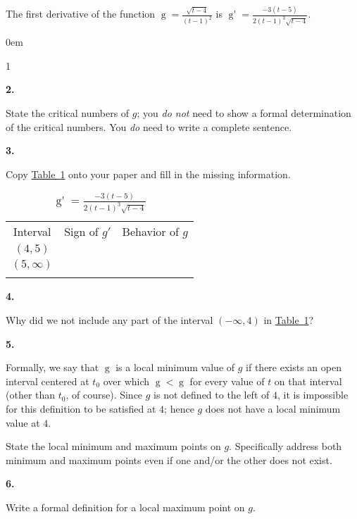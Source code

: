 \documentclass[12pt,]{book}
\newcommand{\lt}{<}
\theoremstyle{plain}
\theoremstyle{definition}
\numberwithin{equation}{section}
\newcommand{\hrulethin}  {\noalign{\hrule height 0.04em}}
\newcommand{\hrulemedium}{\noalign{\hrule height 0.07em}}
\newcommand{\hrulethick} {\noalign{\hrule height 0.11em}}
\newenvironment{exercisegroup}%
{\medskip\noindent}%
{\par\bigskip}%
\newlength{\exercisegroupindent}%
\newlength{\exercisegroupitemwidth}%
\newenvironment{exercisegrouplist}%
{\vspace{-\partopsep}%
\begin{adjustwidth}{\exercisegroupindent}{0em}}%
{\end{adjustwidth}%
\vspace{-\partopsep}%
\vspace{\baselineskip}}%
\newenvironment{exercisegroupbycol}[1]%
{\begin{exercisegrouplist}%
\vspace{-\multicolsep}%
\begin{multicols}{#1}%
\setlength{\parindent}{0em}%
\setlength{\exercisegroupitemwidth}{\linewidth}}%
{\end{multicols}%
\vspace{-\multicolsep}%
\end{exercisegrouplist}}%
\newenvironment{exercisegroupitem}[1]%
{\begin{minipage}[t]{\exercisegroupitemwidth}
\vspace{0pt}%
{\bfseries#1}%
\rule{0pt}{\baselineskip}}{\strut%
\end{minipage}%
\hspace{\columnsep}}%
\providecommand\phantomsection{}
\newcommand{\fe}[2]{\mathop{{#1}{\left(#2\right)}}}
\newcommand{\ointerval}[2]{\left(#1,#2\right)}
\newcommand{\fd}[1]{#1'}
\begin{document}
\begin{exercisegroup}%
The first derivative of the function \(\fe{g}{t}=\frac{\sqrt{t-4}}{(t-1)^2}\) is \(\fe{\fd{g}}{t}=\frac{-3(t-5)}{2(t-1)^3\sqrt{t-4}}\).%
\par
\begin{exercisegroupbycol}{1}%
\begin{exercisegroupitem}{2. }\phantomsection\hypertarget{exercise-22}{\null}
State the critical numbers of \(g\); you \emph{do not} need to show a formal determination of the critical numbers.  You \emph{do} need to write a complete sentence.%
\end{exercisegroupitem}%
\par%
\begin{exercisegroupitem}{3. }\phantomsection\hypertarget{exercise-23}{\null}
Copy \hyperref[table-semi-rational-sign-table]{Table~\ref*{table-semi-rational-sign-table}} onto your paper and fill in the missing information.%
\begin{table}
\centering
\caption{\(\fe{\fd{g}}{t}=\frac{-3(t-5)}{2(t-1)^3\sqrt{t-4}}\)\label{table-semi-rational-sign-table}}
\begin{tabular}{ccc}\hrulethick
Interval&Sign of \(\fd{g}\)&Behavior of \(g\)\\\hrulemedium
\(\ointerval{4}{5}\)&&\\\hrulethin
\(\ointerval{5}{\infty}\)&&\\\hrulethick
\end{tabular}
\end{table}
\end{exercisegroupitem}%
\par%
\begin{exercisegroupitem}{4. }\phantomsection\hypertarget{exercise-24}{\null}
Why did we not include any part of the interval \(\ointerval{-\infty}{4}\) in \hyperref[table-semi-rational-sign-table]{Table~\ref*{table-semi-rational-sign-table}}?%
\end{exercisegroupitem}%
\par%
\begin{exercisegroupitem}{5. }\phantomsection\hypertarget{exercise-25}{\null}
Formally, we say that \(\fe{g}{t_0}\) is a local minimum value of \(g\) if there exists an open interval centered at \(t_0\) over which \(\fe{g}{t_0}\lt\fe{g}{t}\) for every value of \(t\) on that interval (other than \(t_0\), of course).  Since \(g\) is not defined to the left of \(4\), it is impossible for this definition to be satisfied at \(4\); hence \(g\) does not have a local minimum value at \(4\).%
\par
State the local minimum and maximum points on \(g\).  Specifically address both minimum and maximum points even if one and/or the other does not exist.%
\end{exercisegroupitem}%
\par%
\begin{exercisegroupitem}{6. }\phantomsection\hypertarget{exercise-26}{\null}
Write a formal definition for a local maximum point on \(g\).%
\end{exercisegroupitem}%
\par%
\end{exercisegroupbycol}%
\end{exercisegroup}%
\end{document}
